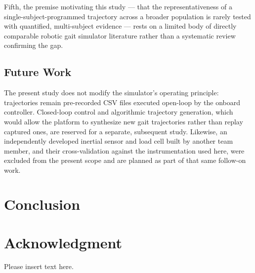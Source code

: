 \documentclass[journal,twocolumn,letterpaper]{IEEEJERM}
\begin{document}
Fifth, the premise motivating this study --- that the representativeness
of a single-subject-programmed trajectory across a broader population
is rarely tested with quantified, multi-subject evidence --- rests on a
limited body of directly comparable robotic gait simulator literature
rather than a systematic review confirming the gap.

\subsection*{Future Work}

The present study does not modify the simulator's operating principle:
trajectories remain pre-recorded CSV files executed open-loop by the
onboard controller. Closed-loop control and algorithmic trajectory
generation, which would allow the platform to synthesize new gait
trajectories rather than replay captured ones, are reserved for a
separate, subsequent study. Likewise, an independently developed
inertial sensor and load cell built by another team member, and their
cross-validation against the instrumentation used here, were excluded
from the present scope and are planned as part of that same follow-on
work.

\section{Conclusion}

\vspace*{0.5 cm}

\section*{Acknowledgment}
Please insert text here.
\end{document}
